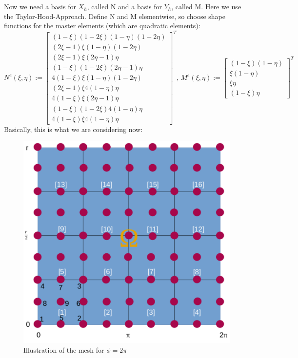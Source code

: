 \documentclass[12pt,a4paper]{report}
\begin{document}
Now we need a basis for \(X_h\), called N and a basis for \(Y_h\), called M. Here we use the Taylor-Hood-Approach. Define N and M elementwise, so choose shape functions for the master elements (which are quadratic elements):
\begin{equation}
N^e (\xi,\eta) :=
\begin{bmatrix}
(1-\xi)(1-2\xi)(1-\eta)(1-2\eta)\\
(2\xi-1)\xi(1-\eta)(1-2\eta)\\
(2\xi-1)\xi(2\eta-1)\eta\\
(1-\xi)(1-2\xi)(2\eta-1)\eta\\
4(1-\xi)\xi(1-\eta)(1-2\eta)\\
(2\xi-1)\xi4(1-\eta)\eta\\
4(1-\xi)\xi(2\eta-1)\eta\\
(1-\xi)(1-2\xi)4(1-\eta)\eta\\
4(1-\xi)\xi4(1-\eta)\eta
\end{bmatrix}^T
,\, M^e (\xi,\eta) :=
\begin{bmatrix}
(1-\xi)(1-\eta)\\
\xi(1-\eta)\\
\xi \eta\\
(1-\xi)\eta
\end{bmatrix}^T
\end{equation}
Basically, this is what we are considering now:
\begin{figure}[H]
\centering
\includegraphics[scale=0.5]{TrMeshStokes3.pdf}
\caption{\label{fig:meshCou}Illustration of the mesh for \(\phi = 2\pi\)}
\end{figure}
\end{document}
